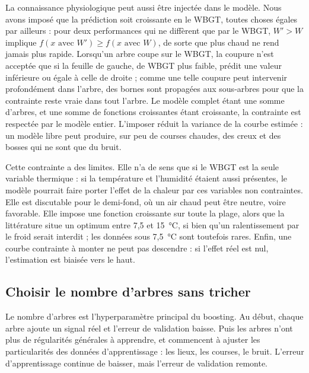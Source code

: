 \documentclass[11pt,a4paper]{article}
\begin{document}
La connaissance physiologique peut aussi être injectée dans le modèle. Nous avons imposé que la prédiction soit
croissante en le WBGT, toutes choses égales par ailleurs : pour deux performances qui ne diffèrent que par le WBGT,
$W' > W$ implique $f(x \text{ avec } W') \geq f(x \text{ avec } W)$, de sorte que plus chaud ne rend jamais plus
rapide. Lorsqu'un arbre coupe sur le WBGT, la coupure n'est acceptée que si la feuille de gauche, de WBGT plus faible,
prédit une valeur inférieure ou égale à celle de droite ; comme une telle coupure peut intervenir profondément dans
l'arbre, des bornes sont propagées aux sous-arbres pour que la contrainte reste vraie dans tout l'arbre. Le modèle
complet étant une somme d'arbres, et une somme de fonctions croissantes étant croissante, la contrainte est respectée
par le modèle entier. L'imposer réduit la variance de la courbe estimée : un modèle libre peut produire, sur peu de
courses chaudes, des creux et des bosses qui ne sont que du bruit.

Cette contrainte a des limites. Elle n'a de sens que si le WBGT est la seule variable thermique : si la température et
l'humidité étaient aussi présentes, le modèle pourrait faire porter l'effet de la chaleur par ces variables non
contraintes. Elle est discutable pour le demi-fond, où un air chaud peut être neutre, voire favorable. Elle impose une
fonction croissante sur toute la plage, alors que la littérature situe un optimum entre 7,5 et 15~°C, si bien qu'un
ralentissement par le froid serait interdit ; les données sous 7,5~°C sont toutefois rares. Enfin, une courbe
contrainte à monter ne peut pas descendre : si l'effet réel est nul, l'estimation est biaisée vers le haut.

\subsection{Choisir le nombre d'arbres sans tricher}\label{sec:nombre_arbres}

Le nombre d'arbres est l'hyperparamètre principal du boosting. Au début, chaque arbre ajoute un signal réel et
l'erreur de validation baisse. Puis les arbres n'ont plus de régularités générales à apprendre, et commencent à
ajuster les particularités des données d'apprentissage : les lieux, les courses, le bruit. L'erreur d'apprentissage
continue de baisser, mais l'erreur de validation remonte.
\end{document}
